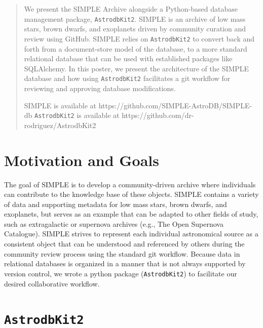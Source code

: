 \documentclass[11pt,twoside]{article}
\begin{document}

  
\begin{abstract}

We present the SIMPLE Archive alongside a Python-based database management package, \texttt{AstrodbKit2}. SIMPLE is an archive of low mass stars, brown dwarfs, and exoplanets driven by community curation and review using GitHub. SIMPLE relies on \texttt{AstrodbKit2} to convert back and forth from a document-store model of the database, to a more standard relational database that can be used with established packages like SQLAlchemy. In this poster, we present the architecture of the SIMPLE database and how using \texttt{AstrodbKit2} facilitates a git workflow for reviewing and approving database modifications.

SIMPLE is available at https://github.com/SIMPLE-AstroDB/SIMPLE-db
\texttt{AstrodbKit2} is available at https://github.com/dr-rodriguez/AstrodbKit2
  
\end{abstract}

\section{Motivation and Goals}

The goal of SIMPLE is to develop a community-driven archive where individuals can contribute to the knowledge base of these objects. 
SIMPLE contains a variety of data and supporting metadata for low mass stars, brown dwarfs, and exoplanets, but serves as an example that can be adapted to other fields of study, such as extragalactic or supernova archives (e.g., The Open Supernova Catalogue). 
SIMPLE strives to represent each individual astronomical source as a consistent object that can be understood and referenced by others during the community review process using the standard git workflow. 
Because data in relational databases is organized in a manner that is not always supported by version control, we wrote a python package (\texttt{AstrodbKit2}) to facilitate our desired collaborative workflow.


\section{\texttt{AstrodbKit2}}
\end{document}
